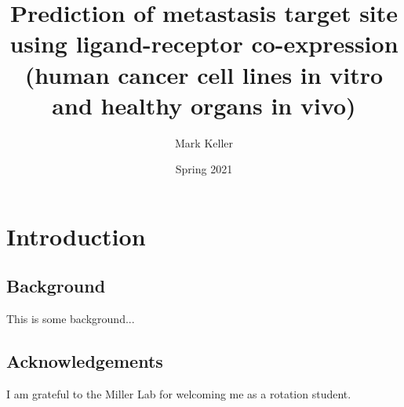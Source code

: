 \documentclass[12pt, letterpaper]{article}
\title{Prediction of metastasis target site using ligand-receptor co-expression (human cancer cell lines in vitro and healthy organs in vivo)}
\author{Mark Keller}
\date{Spring 2021}
\begin{document}
\maketitle

\section{Introduction}
\subsection{Background}
This is some background...


\subsection*{Acknowledgements}
I am grateful to the Miller Lab for welcoming me as a rotation student.


{}

\end{document}
